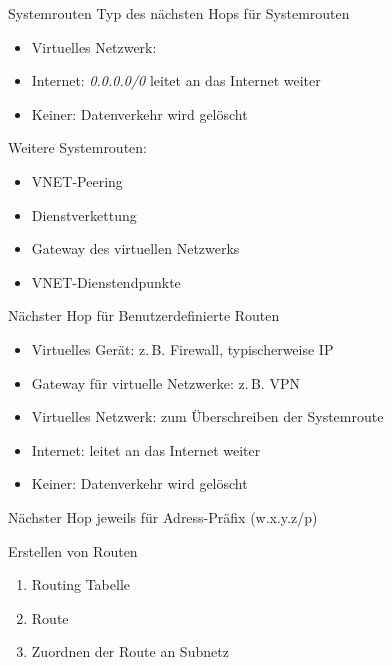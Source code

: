 
\begin{flashcard}[Definition]{Systemrouten}
    Typ des nächsten Hops für Systemrouten
    \begin{itemize}
        \item Virtuelles Netzwerk:
        \item Internet: \emph{0.0.0.0/0} leitet an das Internet weiter
        \item Keiner: Datenverkehr wird gelöscht
    \end{itemize}

    Weitere Systemrouten:
    \begin{itemize}
        \item VNET-Peering
        \item Dienstverkettung
        \item Gateway des virtuellen Netzwerks
        \item VNET-Dienstendpunkte
    \end{itemize}

\end{flashcard}

\begin{flashcard}[Definition]{Nächster Hop für Benutzerdefinierte Routen}
    \begin{itemize}
        \item Virtuelles Gerät: z.\,B. Firewall, typischerweise IP
        \item Gateway für virtuelle Netzwerke: z.\,B. VPN
        \item Virtuelles Netzwerk: zum Überschreiben der Systemroute
        \item Internet: leitet an das Internet weiter
        \item Keiner: Datenverkehr wird gelöscht
    \end{itemize}
    \vspace{1cm}
    Nächster Hop jeweils für Adress-Präfix (w.x.y.z/p)
\end{flashcard}

\begin{flashcard}[Definition]{Erstellen von Routen}
    \begin{enumerate}
        \item Routing Tabelle
        \item Route
        \item Zuordnen der Route an Subnetz
    \end{enumerate}
\end{flashcard}

